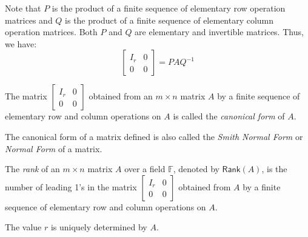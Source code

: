 \documentclass[
	11pt, %
	fleqn, %
	a4paper, %
]{LegrandOrangeBook}
\newcommand{\F}{\mathbb{F}} %
\newcommand{\rank}[1]{\mathsf{Rank}(#1)} %
\begin{document}
\begin{center}
\end{center}

Note that $P$ is the product of a finite sequence of elementary row operation matrices and $Q$ is the product of a finite sequence of elementary column operation matrices. Both $P$ and $Q$ are elementary and invertible matrices. Thus, we have:
\[
    \begin{bmatrix}
        I_r & 0 \\
        0 & 0
    \end{bmatrix} = P A Q^{-1}
\]

\begin{definition}
    The matrix $\begin{bmatrix}
        I_r & 0 \\
        0 & 0
    \end{bmatrix}$ obtained from an $m \times n$ matrix $A$ by a finite sequence of elementary row and column operations on $A$ is called the \emph{canonical form} of $A$.    
\end{definition}

\begin{remark}
    The canonical form of a matrix defined is also called the \emph{Smith Normal Form} or \emph{Normal Form} of a matrix.
\end{remark}

\begin{definition}
    The \emph{rank} of an $m \times n$ matrix $A$ over a field $\F$, denoted by $\rank{A}$, is the number of leading 1's in the matrix $\begin{bmatrix}
        I_r & 0 \\
        0 & 0
    \end{bmatrix}$ obtained from $A$ by a finite sequence of elementary row and column operations on $A$.
\end{definition}

\begin{remark}
    The value $r$ is uniquely determined by $A$.
\end{remark}

\def\matriximg{%
    \begin{matrix}
        I_r & 0 \\
        0 & 0 
    \end{matrix}
}
\end{document}
